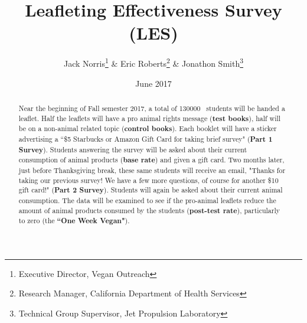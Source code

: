 \documentclass{tufte-handout}
\title{Leafleting Effectiveness Survey (LES)}
\author[Jack Norris \& Eric Roberts \& Jonathon Smith]{Jack Norris\thanks{Executive Director, Vegan Outreach} \& Eric Roberts\thanks{Research Manager, California Department of Health Services} \& Jonathon Smith\thanks{Technical Group Supervisor, Jet Propulsion Laboratory}}
\date{June 2017} %
\newcommand{\totalbooklets}[0]{\textsc{130000}}%
\begin{document}
\maketitle%


\begin{abstract}
\noindent

Near the beginning of Fall semester 2017, a total of \totalbooklets~ 
students will be handed a leaflet. Half the leaflets will have a
pro animal rights message (\textbf{test books}), half will be on a
non-animal related topic (\textbf{control books}). Each booklet will have a
sticker advertising a ``\$5 Starbucks or Amazon Gift Card for taking
brief survey" (\textbf{Part 1 Survey}). Students answering the survey will be 
asked about their current consumption of animal products (\textbf{base rate}) 
and given a gift card. Two months later, just before Thanksgiving 
break, these same students will receive an email, "Thanks for taking 
our previous survey! We have a few more questions, of course for 
another \$10 gift card!" (\textbf{Part 2 Survey}). Students will again
be asked about their current animal consumption. The data will
be examined to see if the pro-animal leaflets reduce the amount of
animal products consumed by the students (\textbf{post-test rate}), 
particularly to zero (the \textbf{``One Week Vegan"}). 

\end{abstract}
\end{document}
